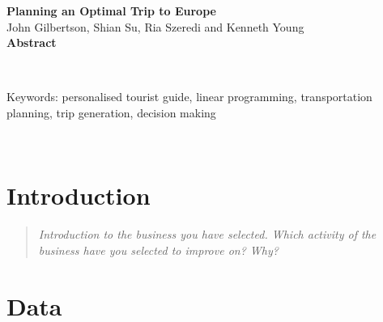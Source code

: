 \documentclass[12pt]{article}
\begin{document}
\clearpage
\vspace*{3cm}
\begin{center}
  {\large \bf Planning an Optimal Trip to Europe}\\[+10pt]
  John Gilbertson, Shian Su, Ria Szeredi and Kenneth Young\\[+10pt]
  {\large \bf Abstract}\\[+10pt]
  \parbox{13cm}{\lipsum[3]}
\\[+20pt]
\parbox{13cm}{
Keywords: personalised tourist guide, linear programming, transportation planning, trip generation, decision making}
\\[+20pt]
\end{center}
\vfill
\clearpage

\tableofcontents
\pagebreak


\section{Introduction}
\label{sec:intro}


\begin{quote} \textit{
Introduction to the business you have selected. Which activity of the business have you selected to
improve on? Why?
} \end{quote}

\lipsum[3]


\pagebreak
\section{Data} 
\label{sec:data}

\end{document}
